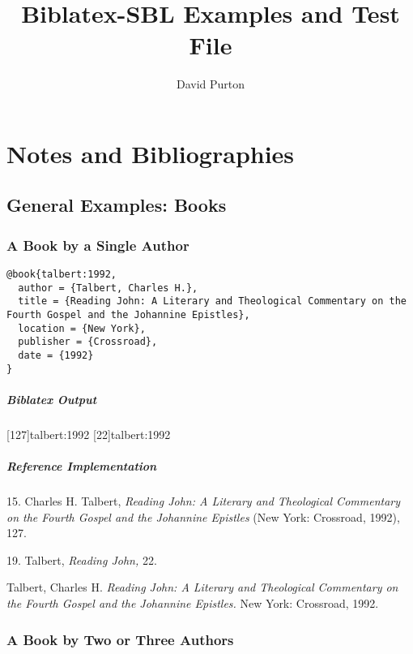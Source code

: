 \documentclass[a4paper]{article}
\newenvironment{biboutput}{%
  \subparagraph{Biblatex Output}
}{\color{black}}
\newenvironment{refimp}{%
  \subparagraph{Reference Implementation}
  \color{reference-colour}
  \rm
}{\par\color{black}}
\begin{document}
\title{Biblatex-SBL Examples and Test File}
\author{David Purton}
\maketitle

\tableofcontents

\clearpage

\setcounter{section}{5}

\section{Notes and Bibliographies}

\setcounter{subsection}{1}
\subsection{General Examples: Books}

\subsubsection{A Book by a Single Author}

\begin{lstlisting}
@book{talbert:1992,
  author = {Talbert, Charles H.},
  title = {Reading John: A Literary and Theological Commentary on the Fourth Gospel and the Johannine Epistles},
  location = {New York},
  publisher = {Crossroad},
  date = {1992}
}
\end{lstlisting}

\begin{biboutput}
  [127]{talbert:1992}
  [22]{talbert:1992}
\end{biboutput}

\begin{refimp}
  15. Charles H. Talbert, \emph{Reading John: A Literary and Theological
  Commentary on the Fourth Gospel and the Johannine Epistles} (New York:
  Crossroad, 1992), 127.

  19. Talbert, \emph{Reading John,} 22.

  \hangindent\bibindent Talbert, Charles H. \emph{Reading John: A Literary and
  Theological Commentary on the Fourth Gospel and the Johannine Epistles.} New
  York: Crossroad, 1992.
\end{refimp}

\subsubsection{A Book by Two or Three Authors}
\end{document}
